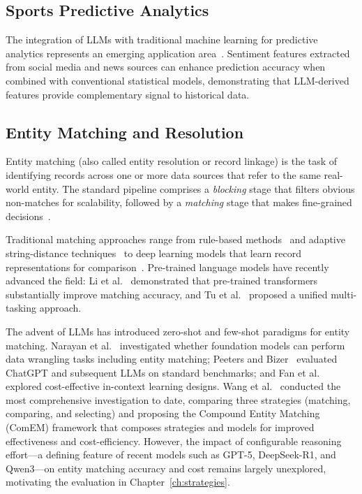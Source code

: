 \subsection{Sports Predictive Analytics}

The integration of LLMs with traditional machine learning for predictive analytics represents an emerging application area~\cite{bunker2022sports,wang2023stock}. Sentiment features extracted from social media and news sources can enhance prediction accuracy when combined with conventional statistical models, demonstrating that LLM-derived features provide complementary signal to historical data.%

\subsection{Entity Matching and Resolution}

Entity matching (also called entity resolution or record linkage) is the task of identifying records across one or more data sources that refer to the same real-world entity.  The standard pipeline comprises a \emph{blocking} stage that filters obvious non-matches for scalability, followed by a \emph{matching} stage that makes fine-grained decisions~\cite{fellegi1969theory,getoor2012entity,papadakis2021blocking,binette2022almost}.

Traditional matching approaches range from rule-based methods~\cite{benjelloun2009swoosh,li2015rule} and adaptive string-distance techniques~\cite{bilenko2003adaptive} to deep learning models that learn record representations for comparison~\cite{mudgal2018deep,barlaug2021neural}.  Pre-trained language models have recently advanced the field: Li et al.~\cite{li2020deep} demonstrated that pre-trained transformers substantially improve matching accuracy, and Tu et al.~\cite{tu2023unicorn} proposed a unified multi-tasking approach.

The advent of LLMs has introduced zero-shot and few-shot paradigms for entity matching.  Narayan et al.~\cite{narayan2022can} investigated whether foundation models can perform data wrangling tasks including entity matching; Peeters and Bizer~\cite{peeters2023using,peeters2025entity} evaluated ChatGPT and subsequent LLMs on standard benchmarks; and Fan et al.~\cite{fan2024cost} explored cost-effective in-context learning designs.  Wang et al.~\cite{wang2025match} conducted the most comprehensive investigation to date, comparing three strategies (matching, comparing, and selecting) and proposing the Compound Entity Matching (ComEM) framework that composes strategies and models for improved effectiveness and cost-efficiency.  However, the impact of configurable reasoning effort---a defining feature of recent models such as GPT-5, DeepSeek-R1, and Qwen3---on entity matching accuracy and cost remains largely unexplored, motivating the evaluation in Chapter~\ref{ch:strategies}.

